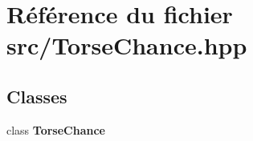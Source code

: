 \section{Référence du fichier src/\-Torse\-Chance.hpp}
\label{_torse_chance_8hpp}
\subsection*{Classes}
\begin{DoxyCompactItemize}
\item 
class {\bf Torse\-Chance}
\end{DoxyCompactItemize}
